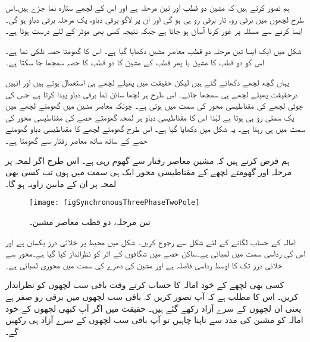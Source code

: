  ہم تصور کرتے ہیں کہ مشین دو قطب اور تین مرحلہ ہے اور اس کے لچھے ستارہ نما جڑے  ہیں۔اس طرح لچھوں میں برقی رو، تار برقی رو ہی ہو گی اور ان پر لاگو برقی دباو، یک مرحلہ برقی دباو ہو گی۔ایسا کرنے سے مسئلہ پر غور کرنا آسان ہو جاتا ہے جبکہ نتیجہ کسی بھی موٹر کے لئے درست ہوتا ہے۔

شکل   میں ایک ایسا تین مرحلہ دو قطب معاصر مشین دکھایا گیا ہے۔ اس کا گھومتا حصہ نلکی نما ہے۔اس کو دو قطب کا مشین یا پھر  قطب کے مشین کا دو قطب کا حصہ سمجھا جا سکتا ہے۔

 یہاں گچھ لچھے دکھائے گئے ہیں لیکن حقیقت میں پھیلے لچھے ہی استعمال ہوتے ہیں اور انہیں درحقیقت پھیلے لچھے ہی سمجھا جائے۔ اس طرح ہر لچھا سائن نما برقی دباو پیدا کرتا ہے جس کی چوٹی لچھے کی مقناطیسی محور کی سمت میں ہوتی ہے۔  چونکہ معاصر مشین میں گھومتے لچھے میں یک سمتی رو ہی ہوتا ہے لہٰذا اس کا مقناطیسی دباو ہر لمحہ گھومتے حصے کی مقناطیسی محور کی سمت میں ہی رہتا ہے۔ یہ شکل میں دکھایا گیا ہے۔ اس طرح گھومتے لچھے کا مقناطیسی دباو گھومتے حصے کے ساتھ ساتھ معاصر رفتار سے گھومتا ہے۔

ہم فرض کرتے ہیں کہ مشین معاصر رفتار  سے گھوم رہی ہے۔ اس طرح اگر لمحہ  پر مرحلہ  اور گھومتے لچھے کے مقناطیسی محور ایک ہی سمت میں ہوں تب کسی بھی لمحہ  پر ان کے مابین زاویہ  ہو گا۔
\begin{figure}
\centering
\texttt{[image: figSynchronousThreePhaseTwoPole]}
\caption{تین مرحلہ، دو قطب معاصر مشین۔}
\label{شکل_معاصر_تین_دور_دو_قطب}
\end{figure}
امالہ کے حساب لگانے کے لئے شکل   سے رجوع کریں۔ شکل میں محیط پر خلائی درز یکساں ہے  اور اس کی رداسی سمت میں لمبائی  ہے۔ساکن حصے میں شگافوں کے اثر کو نظرانداز کیا گیا ہے۔محور سے خلائی درز تک کا اوسط رداسی فاصلہ  ہے اور مشین کی دھرے کی سمت میں محوری لمبائی  ہے۔

کسی بھی لچھے کے خود امالہ کا حساب کرتے وقت باقی سب لچھوں کو نظرانداز کریں۔ اس کا مطلب ہے کہ آپ تصور کریں کہ باقی سب لچھوں میں برقی رو صفر ہے یعنی ان لچھوں  کے سرے آزاد رکھے گئے ہیں۔ حقیقت میں اگر آپ کبھی لچھوں کے خود امالہ کو مشین کی مدد سے ناپنا چاہیں تو آپ باقی سب لچھوں کے سرے آزاد ہی رکھیں گے۔ 

